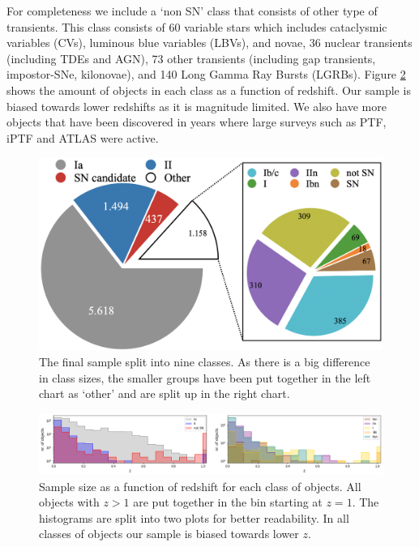 \documentclass[a4paper,oneside,12pt, class=Latex/Classes/PhDthesisPSnPDF, crop=false]{standalone}
\begin{document}
For completeness we include a `non SN' class that consists of other type of transients. This class consists of 60 variable stars which includes cataclysmic variables (CVs), luminous blue variables (LBVs), and novae, 36 nuclear transients (including TDEs and AGN), 73 other transients (including gap transients, impostor-SNe, kilonovae), and 140 Long Gamma Ray Bursts (LGRBs).
Figure \ref{class_hists} shows the amount of objects in each class as a function of redshift. Our sample is biased towards lower redshifts as it is magnitude limited. We also have more objects that have been discovered in years where large surveys such as PTF, iPTF and ATLAS were active.


\begin{figure}
    \centering
    \includegraphics[width=\textwidth]{../Images/chapter_4/sample_pie.png}
    \caption{The final sample split into nine classes. As there is a big difference in class sizes, the smaller groups have been put together in the left chart as `other' and are split up in the right chart.}
    \label{class_breakdown}
\end{figure}


\begin{figure}
    \centering
    \includegraphics[width=\textwidth]{../Images/chapter_4/sample_hists.png}
    \caption{Sample size as a function of redshift for each class of objects. All objects with $z>1$ are put together in the bin starting at $z=1$. The histograms are split into two plots for better readability. In all classes of objects our sample is biased towards lower $z$.}
    \label{class_hists}    
\end{figure}
\end{document}
